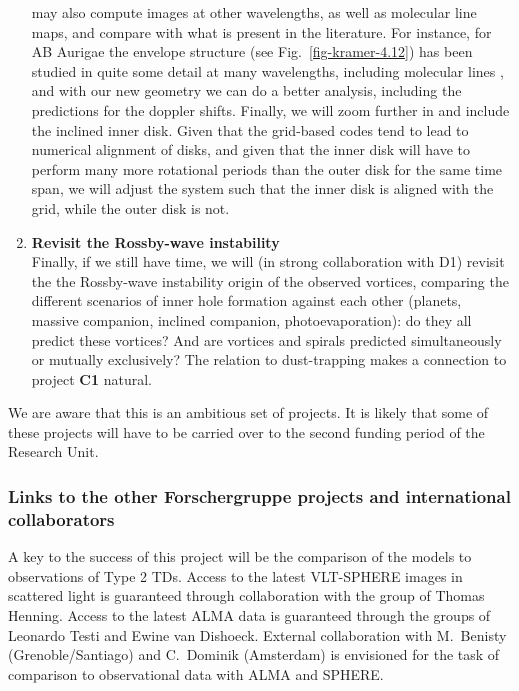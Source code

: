 \documentclass[10pt,fleqn,twoside]{article}
\begin{document}
\begin{enumerate}
  may also compute images at other wavelengths, as well as molecular line
  maps, and compare with what is present in the literature. For instance,
  for AB Aurigae the envelope structure (see Fig.~\ref{fig-kramer-4.12}) has
  been studied in quite some detail at many wavelengths, including molecular
  lines \citep{2005ApJ...621..853S}, and with our new geometry we can do a
  better analysis, including the predictions for the doppler shifts.
  Finally, we will zoom further in and include the inclined inner
  disk. Given that the grid-based codes tend to lead to numerical alignment
  of disks, and given that the inner disk will have to perform many more
  rotational periods than the outer disk for the same time span, we will
  adjust the system such that the inner disk is aligned with the grid, while
  the outer disk is not.
\item {\bf Revisit the Rossby-wave instability}\\
  Finally, if we still have time, we will (in strong collaboration with D1)
  revisit the the Rossby-wave instability origin of the observed vortices,
  comparing the different scenarios of inner hole formation against each
  other (planets, massive companion, inclined companion, photoevaporation):
  do they all predict these vortices? And are vortices and spirals predicted
  simultaneously or mutually exclusively? The relation to dust-trapping
  makes a connection to project {\bf C1} natural. 
\end{enumerate}

We are aware that this is an ambitious set of projects. It is likely that
some of these projects will have to be carried over to the second funding
period of the Research Unit.


\subsubsection{Links to the other Forschergruppe projects and international collaborators}
A key to the success of this project will be the comparison of the models to
observations of Type 2 TDs. Access to the latest VLT-SPHERE images in
scattered light is guaranteed through collaboration with the group of Thomas
Henning. Access to the latest ALMA data is guaranteed through the groups of
Leonardo Testi  and Ewine van
Dishoeck.  External collaboration with M.~Benisty (Grenoble/Santiago) and
C.~Dominik (Amsterdam) is envisioned for the task of comparison to
observational data with ALMA and SPHERE.
\end{document}
